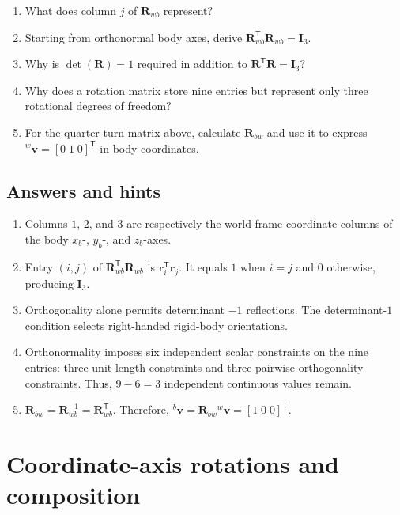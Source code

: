 \documentclass[
  australian,
  12pt,
  letterpaper,
  DIV=11,
  numbers=noendperiod,
  twoside]{scrreprt}
\providecommand{\tightlist}{%
  \setlength{\itemsep}{0pt}\setlength{\parskip}{0pt}}
\begin{document}
\begin{enumerate}
\def\labelenumi{\arabic{enumi}.}
\tightlist
\item
  What does column \(j\) of \(\mathbf R_{wb}\) represent?
\item
  Starting from orthonormal body axes, derive
  \(\mathbf R_{wb}^\mathsf T\mathbf R_{wb}=\mathbf I_3\).
\item
  Why is \(\det(\mathbf R)=1\) required in addition to
  \(\mathbf R^\mathsf T\mathbf R=\mathbf I_3\)?
\item
  Why does a rotation matrix store nine entries but represent only three
  rotational degrees of freedom?
\item
  For the quarter-turn matrix above, calculate \(\mathbf R_{bw}\) and
  use it to express \({}^{w}\mathbf v=[0\;1\;0]^\mathsf T\) in body
  coordinates.
\end{enumerate}

\subsection*{Answers and hints}\label{answers-and-hints-16}

\begin{enumerate}
\def\labelenumi{\arabic{enumi}.}
\tightlist
\item
  Columns \(1\), \(2\), and \(3\) are respectively the world-frame
  coordinate columns of the body \(x_b\)-, \(y_b\)-, and \(z_b\)-axes.
\item
  Entry \((i,j)\) of \(\mathbf R_{wb}^\mathsf T\mathbf R_{wb}\) is
  \(\mathbf r_i^\mathsf T\mathbf r_j\). It equals \(1\) when \(i=j\) and
  \(0\) otherwise, producing \(\mathbf I_3\).
\item
  Orthogonality alone permits determinant \(-1\) reflections. The
  determinant-\(1\) condition selects right-handed rigid-body
  orientations.
\item
  Orthonormality imposes six independent scalar constraints on the nine
  entries: three unit-length constraints and three
  pairwise-orthogonality constraints. Thus, \(9-6=3\) independent
  continuous values remain.
\item
  \(\mathbf R_{bw}=\mathbf R_{wb}^{-1}=\mathbf R_{wb}^\mathsf T\).
  Therefore,
  \({}^{b}\mathbf v=\mathbf R_{bw}{}^{w}\mathbf v=[1\;0\;0]^\mathsf T\).
\end{enumerate}

\section{Coordinate-axis rotations and
composition}\label{sec-so3-axis-rotations-composition}
\end{document}
